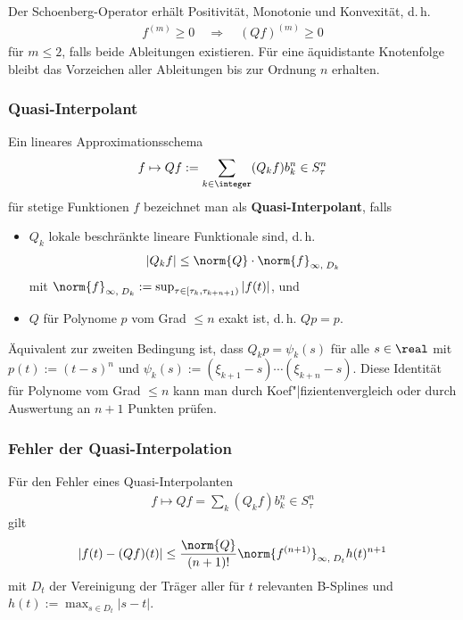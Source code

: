 Der Schoenberg-Operator erhält Positivität, Monotonie und Konvexität, d.\,h.
\begin{align*}
    f^{(m)} \ge 0 \quad\Rightarrow\quad
    (Qf)^{(m)} \ge 0
\end{align*}
für $m \le 2$, falls beide Ableitungen existieren.
Für eine äquidistante Knotenfolge bleibt das Vorzeichen aller Ableitungen
bis zur Ordnung $n$ erhalten.

\subsubsection{%
    Quasi-Interpolant%
}

Ein lineares Approximationsschema
\begin{align*}
    f \mapsto Qf := \sum_{k \in \integer} (Q_k f) b_k^n \in S_\tau^n
\end{align*}
für stetige Funktionen $f$ bezeichnet man als \textbf{Quasi-Interpolant}, falls
\begin{itemize}
    \item
    $Q_k$ lokale beschränkte lineare Funktionale sind, d.\,h.
    \begin{align*}
        |Q_k f| \le \norm{Q} \cdot \norm{f}_{\infty,\; D_k}
    \end{align*}
    mit $\norm{f}_{\infty,\; D_k} :=
    \sup_{\tau \in [\tau_k, \tau_{k+n+1})} |f(t)|$, und
    
    \item
    $Q$ für Polynome $p$ vom Grad $\le n$ exakt ist, d.\,h. $Qp = p$.
\end{itemize}
Äquivalent zur zweiten Bedingung ist, dass $Q_k p = \psi_k(s)$ für alle
$s \in \real$ mit $p(t) := (t - s)^n$ und
$\psi_k(s) := (\xi_{k+1} - s) \dotsm (\xi_{k+n} - s)$.
Diese Identität für Polynome vom Grad $\le n$ kann man durch
Koef"|fizientenvergleich oder durch Auswertung an $n + 1$ Punkten prüfen.

\subsubsection{%
    Fehler der Quasi-Interpolation%
}

Für den Fehler eines Quasi-Interpolanten
\begin{align*}
    f \mapsto Qf = \sum_k (Q_k f) b_k^n \in S_\tau^n
\end{align*}
gilt
\begin{align*}
    |f(t) - (Qf)(t)| \le \frac{\norm{Q}}{(n + 1)!}
    \norm{f^{(n+1)}}_{\infty,\; D_t} h(t)^{n+1}
\end{align*}
mit $D_t$ der Vereinigung der Träger aller für $t$ relevanten B-Splines
und $h(t) := \max_{s \in D_t} |s - t|$.

